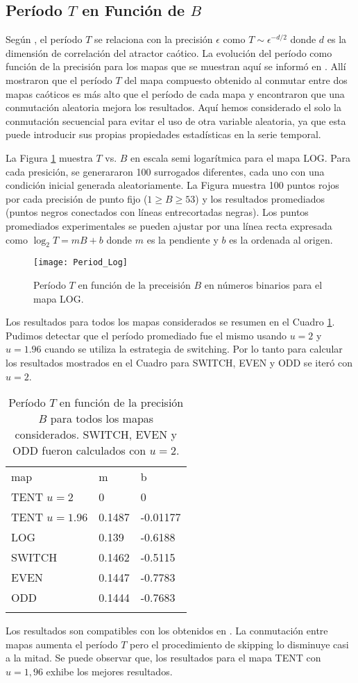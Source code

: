 \subsection{Período $T$ en Función de $B$}

Según \cite{Grebogi1988}, el período $T$ se relaciona con la precisión $\epsilon$ como $T \sim \epsilon^{-d/2}$ donde $d$ es la dimensión de correlación del atractor caótico.
La evolución del período como función de la precisión para los mapas que se muestran aquí se informó en \cite{Nagaraj2008}.
Allí mostraron que el período $T$ del mapa compuesto obtenido al conmutar entre dos mapas caóticos es más alto que el período de cada mapa y encontraron que una conmutación aleatoria mejora los resultados.
Aquí hemos considerado el solo la conmutación secuencial para evitar el uso de otra variable aleatoria, ya que esta puede introducir sus propias propiedades estadísticas en la serie temporal.

La Figura \ref{fig:period} muestra $T$ vs. $B$ en escala semi logarítmica para el mapa LOG.
Para cada presición, se generararon 100 surrogados diferentes, cada uno con una condición inicial generada aleatoriamente.
La Figura muestra 100 puntos rojos por cada precisión de punto fijo ($1 \geq B \geq 53$) y los resultados promediados (puntos negros conectados con líneas entrecortadas negras).
Los puntos promediados experimentales se pueden ajustar por una línea recta expresada como $\log_2 T = mB + b$ donde $m$ es la pendiente y $b$ es la ordenada al origen.
%
\begin{figure}[htpb]
\centering	
	\texttt{[image: Period\_Log]}
	\caption{Período $T$ en función de la preceisión $B$ en números binarios para el mapa LOG.} \label{fig:period}
\end{figure}

Los resultados para todos los mapas considerados se resumen en el Cuadro \ref{tabla:periodos}.
Pudimos detectar que el período promediado fue el mismo usando $u=2$ y $u=1.96$ cuando se utiliza la estrategia de switching.
Por lo tanto para calcular los resultados mostrados en el Cuadro para SWITCH, EVEN y ODD se iteró con $u=2$.
%
\begin{table}[htpb]
	\centering	
	\caption{Período $T$ en función de la precisión $B$ para todos los mapas considerados. SWITCH, EVEN y ODD fueron calculados con $u=2$.}
	\vspace{1em}
	\begin{tabular}{lll}
		\hline\noalign{\smallskip}
		map 			& m 	& b  \\
		\noalign{\smallskip}\hline\noalign{\smallskip}
		TENT $u=2$		&0 		& 0 \\
		TENT $u=1.96$ 	&0.1487 & -0.01177 \\
		LOG 			&0.139 	& -0.6188 \\
		SWITCH 			&0.1462 & -0.5115 \\
		EVEN 			&0.1447 & -0.7783 \\
		ODD 			&0.1444 & -0.7683 \\
		\noalign{\smallskip}\hline
	\end{tabular}
	\label{tabla:periodos}	
\end{table}

Los resultados son compatibles con los obtenidos en \cite{Nagaraj2008}.
La conmutación entre mapas aumenta el período $T$ pero el procedimiento de skipping lo disminuye casi a la mitad.
Se puede observar que, los resultados para el mapa TENT con $u=1,96$ exhibe los mejores resultados.